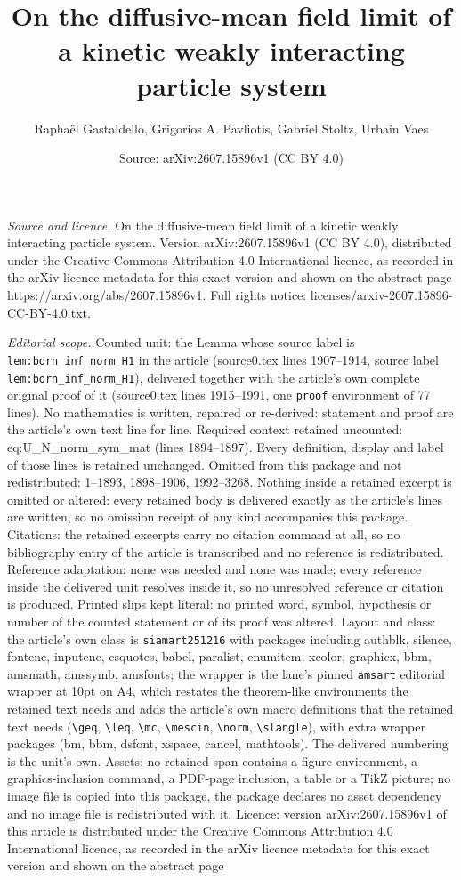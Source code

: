 \documentclass[10pt,a4paper]{amsart}
\title[On the diffusive-mean field limit of a kinetic weakly intera]{On the diffusive-mean field limit of a kinetic weakly interacting particle system}
\author{Rapha\"el Gastaldello, Grigorios A. Pavliotis, Gabriel Stoltz, Urbain Vaes}
\date{Source: arXiv:2607.15896v1 (CC BY 4.0)}
\begin{document}
\maketitle

\noindent\emph{Source and licence.} On the diffusive-mean field limit of a kinetic weakly interacting particle system. Version arXiv:2607.15896v1 (CC BY 4.0), distributed under the Creative Commons Attribution 4.0 International licence, as recorded in the arXiv licence metadata for this exact version and shown on the abstract page https://arxiv.org/abs/2607.15896v1. Full rights notice: licenses/arxiv-2607.15896-CC-BY-4.0.txt.\par\smallskip

\noindent\textit{Editorial scope.} Counted unit: the Lemma whose source label is \texttt{lem:born\_inf\_norm\_H1} in the article (source0.tex lines 1907--1914, source label \texttt{lem:born\_inf\_norm\_H1}), delivered together with the article's own complete original proof of it (source0.tex lines 1915--1991, one \texttt{proof} environment of 77 lines). No mathematics is written, repaired or re-derived: statement and proof are the article's own text line for line. Required context retained uncounted: eq:U\_N\_norm\_sym\_mat (lines 1894--1897). Every definition, display and label of those lines is retained unchanged. Omitted from this package and not redistributed: 1--1893, 1898--1906, 1992--3268. Nothing inside a retained excerpt is omitted or altered: every retained body is delivered exactly as the article's lines are written, so no omission receipt of any kind accompanies this package. Citations: the retained excerpts carry no citation command at all, so no bibliography entry of the article is transcribed and no reference is redistributed. Reference adaptation: none was needed and none was made; every reference inside the delivered unit resolves inside it, so no unresolved reference or citation is produced. Printed slips kept literal: no printed word, symbol, hypothesis or number of the counted statement or of its proof was altered. Layout and class: the article's own class is \texttt{siamart251216} with packages including authblk, silence, fontenc, inputenc, csquotes, babel, paralist, enumitem, xcolor, graphicx, bbm, amsmath, amssymb, amsfonts; the wrapper is the lane's pinned \texttt{amsart} editorial wrapper at 10pt on A4, which restates the theorem-like environments the retained text needs and adds the article's own macro definitions that the retained text needs (\texttt{\textbackslash geq}, \texttt{\textbackslash leq}, \texttt{\textbackslash mc}, \texttt{\textbackslash mescin}, \texttt{\textbackslash norm}, \texttt{\textbackslash slangle}), with extra wrapper packages (bm, bbm, dsfont, xspace, cancel, mathtools). The delivered numbering is the unit's own. Assets: no retained span contains a figure environment, a graphics-inclusion command, a PDF-page inclusion, a table or a TikZ picture; no image file is copied into this package, the package declares no asset dependency and no image file is redistributed with it. Licence: version arXiv:2607.15896v1 of this article is distributed under the Creative Commons Attribution 4.0 International licence, as recorded in the arXiv licence metadata for this exact version and shown on the abstract page 
\end{document}
